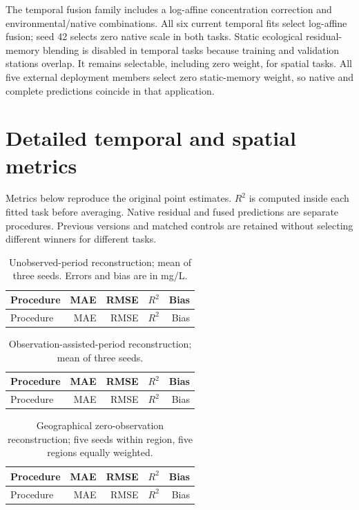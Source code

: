 \documentclass[10pt]{article}
\newcommand{\keeptablewithspace}[1]{\par\ifdim\dimexpr\pagegoal-\pagetotal\relax<#1\newpage\fi}
\begin{document}
The temporal fusion family includes a log-affine concentration correction and environmental/native combinations. All six current temporal fits select log-affine fusion; seed 42 selects zero native scale in both tasks. Static ecological residual-memory blending is disabled in temporal tasks because training and validation stations overlap. It remains selectable, including zero weight, for spatial tasks. All five external deployment members select zero static-memory weight, so native and complete predictions coincide in that application.

\section{Detailed temporal and spatial metrics}
Metrics below reproduce the original point estimates. $R^2$ is computed inside each fitted task before averaging. Native residual and fused predictions are separate procedures. Previous versions and matched controls are retained without selecting different winners for different tasks.

\keeptablewithspace{18\baselineskip}
\begin{longtable}{L{7.2cm}rrrr}
\caption{Unobserved-period reconstruction; mean of three seeds. Errors and bias are in mg/L.}\\
\toprule Procedure & MAE & RMSE & $R^2$ & Bias\\\midrule\endfirsthead
\toprule Procedure & MAE & RMSE & $R^2$ & Bias\\\midrule\endhead

\end{longtable}

\keeptablewithspace{18\baselineskip}
\begin{longtable}{L{7.2cm}rrrr}
\caption{Observation-assisted-period reconstruction; mean of three seeds.}\\
\toprule Procedure & MAE & RMSE & $R^2$ & Bias\\\midrule\endfirsthead
\toprule Procedure & MAE & RMSE & $R^2$ & Bias\\\midrule\endhead

\end{longtable}

\begin{longtable}{L{7.2cm}rrrr}
\caption{Geographical zero-observation reconstruction; five seeds within region, five regions equally weighted.}\\
\toprule Procedure & MAE & RMSE & $R^2$ & Bias\\\midrule\endfirsthead
\toprule Procedure & MAE & RMSE & $R^2$ & Bias\\\midrule\endhead

\end{longtable}
\end{document}
